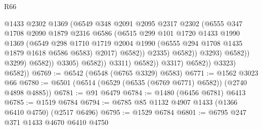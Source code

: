 \begin{lexlean}{R66}
\begin{coremodule}
                                            @1433
                                            @2302
                                            @1369
                                            (@6549
                                              @348
                                              @2091
                                              @2095
                                              @2317
                                              @2302
                                              (@6555
                                                @347
                                                @1708
                                                @2090
                                                @1879
                                                @2316
                                                @6586
                                                (@6515
                                                  @299
                                                  @101
                                                  @1720
                                                  @1433
                                                  @1990
                                                  @1369
                                                  (@6549
                                                    @298
                                                    @1710
                                                    @1719
                                                    @2004
                                                    @1990
                                                    (@6555 @294 @1708 @1435 @1879 @1618 @6586 @6583)
                                                    @2017)
                                                  @6582))
                                              @2335)
                                            @6582))
                                        @3293)
                                      @6582))
                                  @3299)
                                @6582))
                            @3305)
                          @6582))
                      @3311)
                    @6582))
                @3317)
              @6582))
          @3323)
        @6582))
@6769 := @6542 (@6548 (@6765 @3329) @6583)
@6771 := @1562 @3023 @66
@6780 := @6501 (@6514 (@6529 (@6535 (@6769 @6771) @6582)) (@2740 @4898 @4885))
@6781 := @91 @6479
@6784 := @1480 (@6456 @6781) @6413
@6785 := @1519 @6784
@6794 := @6785 @85 @1132 @4907 @1433 (@1366 @6410 @4750) (@2517 @6496)
@6795 := @1529 @6784
@6801 := @6795 @247 @371 @1433 @4670 @6410 @4750

\end{coremodule}
\end{lexlean}
